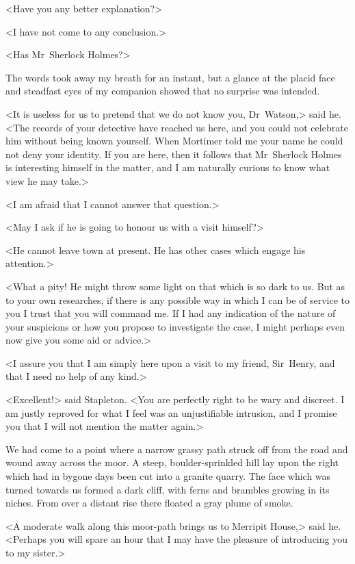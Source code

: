 <Have you any better explanation?>

<I have not come to any conclusion.>

<Has Mr~Sherlock Holmes?>

The words took away my breath for an instant, but a glance at the placid face and steadfast eyes of my companion showed that no surprise was intended.

<It is useless for us to pretend that we do not know you, Dr~Watson,> said he. <The records of your detective have reached us here, and you could not celebrate him without being known yourself. When Mortimer told me your name he could not deny your identity. If you are here, then it follows that Mr~Sherlock Holmes is interesting himself in the matter, and I am naturally curious to know what view he may take.>

<I am afraid that I cannot answer that question.>

<May I ask if he is going to honour us with a visit himself?>

<He cannot leave town at present. He has other cases which engage his attention.>

<What a pity! He might throw some light on that which is so dark to us. But as to your own researches, if there is any possible way in which I can be of service to you I trust that you will command me. If I had any indication of the nature of your suspicions or how you propose to investigate the case, I might perhaps even now give you some aid or advice.>

<I assure you that I am simply here upon a visit to my friend, Sir~Henry, and that I need no help of any kind.>

<Excellent!> said Stapleton. <You are perfectly right to be wary and discreet. I am justly reproved for what I feel was an unjustifiable intrusion, and I promise you that I will not mention the matter again.>

We had come to a point where a narrow grassy path struck off from the road and wound away across the moor. A steep, boulder-sprinkled hill lay upon the right which had in bygone days been cut into a granite quarry. The face which was turned towards us formed a dark cliff, with ferns and brambles growing in its niches. From over a distant rise there floated a gray plume of smoke.

<A moderate walk along this moor-path brings us to Merripit House,> said he. <Perhaps you will spare an hour that I may have the pleasure of introducing you to my sister.>

